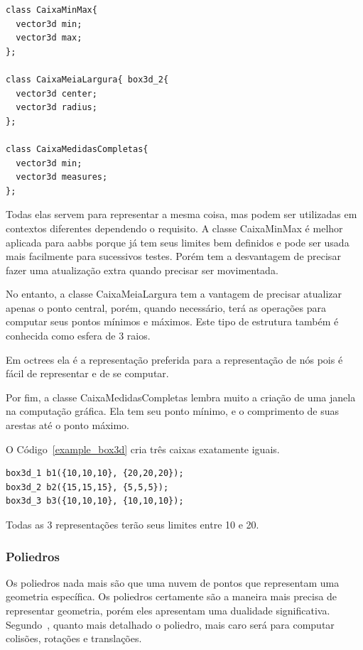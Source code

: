 \begin{lstlisting}[frame=single,caption=Representação de caixa ponto mínimo e máximo\label{code:box3d}]
class CaixaMinMax{
  vector3d min;
  vector3d max;
};

class CaixaMeiaLargura{ box3d_2{
  vector3d center;
  vector3d radius;
};

class CaixaMedidasCompletas{
  vector3d min;
  vector3d measures;
};
\end{lstlisting}


Todas elas servem para representar a mesma coisa, mas podem ser utilizadas em
contextos diferentes dependendo o requisito. A classe CaixaMinMax é melhor aplicada para aabbs porque já tem seus limites bem definidos e pode ser usada mais facilmente para sucessivos testes. Porém tem a desvantagem de precisar fazer uma atualização extra quando precisar ser movimentada.

No entanto, a classe CaixaMeiaLargura tem a vantagem de precisar atualizar apenas o ponto
central, porém, quando necessário, terá as operações para computar seus pontos
mínimos e máximos. Este tipo de estrutura também é conhecida como esfera de 3
raios.

Em octrees ela é a representação preferida para a representação de nós
pois é fácil de representar e de se computar.

Por fim, a classe CaixaMedidasCompletas lembra muito a criação de uma janela na computação gráfica. Ela tem seu
ponto mínimo, e o comprimento de suas arestas até o ponto máximo.

O Código~\ref{example_box3d} cria três caixas exatamente iguais.

\begin{lstlisting}[frame=single,caption=Código de exemplo de criação de 3 caixas\label{example_box3d}]
box3d_1 b1({10,10,10}, {20,20,20});
box3d_2 b2({15,15,15}, {5,5,5});
box3d_3 b3({10,10,10}, {10,10,10});
\end{lstlisting}

Todas as 3 representações terão seus limites entre 10 e 20.


\subsubsection{Poliedros}

Os poliedros nada mais são que uma nuvem de pontos que representam uma
geometria específica. Os poliedros certamente são a maneira mais precisa de
representar geometria, porém eles apresentam uma dualidade significativa. Segundo~, quanto mais
detalhado o poliedro, mais caro será para computar colisões, rotações e
translações.


